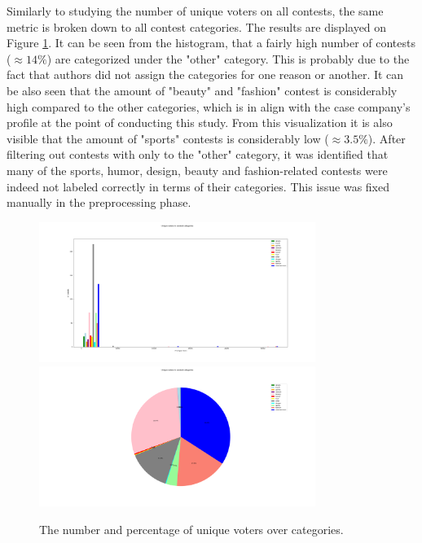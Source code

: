     Similarly to studying the number of unique voters on all contests, the same metric is broken down to all contest categories. The results are displayed on Figure \ref{user_engagement_in_categories}. It can be seen from the histogram, that a fairly high number of contests ($\approx 14 \% $) are categorized under the "other" category. This is probably due to the fact that authors did not assign the categories for one reason or another. It can be also seen that the amount of "beauty" and "fashion" contest is considerably high compared to the other categories, which is in align with the case company's profile at the point of conducting this study. From this visualization it is also visible that the amount of "sports" contests is considerably low ($\approx 3.5 \% $). After filtering out contests with only to the "other" category, it was identified that many of the sports, humor, design, beauty and fashion-related contests were indeed not labeled correctly in terms of their categories. This issue was fixed manually in the preprocessing phase. 

    \begin{figure}[h] 
        \begin{center}
            \includegraphics[width=0.8\textwidth]{Images/user_engagement_in_categories_bar.png}
            \includegraphics[width=0.8\textwidth]{Images/user_engagement_in_categories_pie.png}
            \caption{The number and percentage of unique voters over categories.}
            \label{user_engagement_in_categories}
        \end{center}
    \end{figure}

